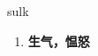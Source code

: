 
\begin{frame}
{\huge sulk}
\begin{center}
\begin{enumerate}\Large
  \item \textbf{生气，愠怒}
\end{enumerate}
\end{center}
\end{frame}
